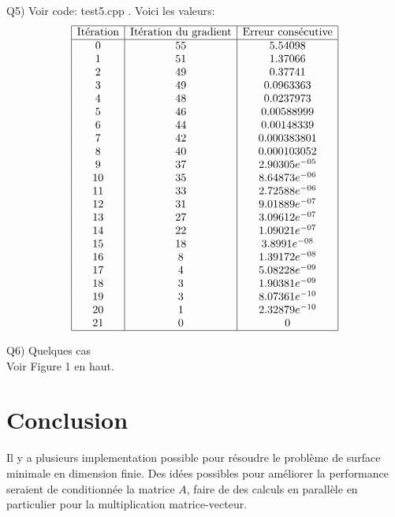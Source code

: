 \documentclass[a4paper, 11pt]{article}
\begin{document}
Q5) Voir code: test5.cpp . Voici les valeurs: \\
$$
\begin{array}{|c|c|c|}
\hline
\text{It\'eration} & \text{It\'eration du gradient} & \text{Erreur cons\'ecutive}
 \\
\hline
0 & 55 & 5.54098 \\
1 & 51 & 1.37066 \\
2 & 49 & 0.37741 \\
3 & 49 & 0.0963363 \\
4 & 48 & 0.0237973 \\
5 & 46 & 0.00588999 \\
6 & 44 & 0.00148339 \\
7 & 42 & 0.000383801 \\
8 & 40 & 0.000103052 \\
9 & 37 & 2.90305e^{-05} \\
10 & 35 & 8.64873e^{-06} \\
11 & 33 & 2.72588e^{-06} \\
12 & 31 & 9.01889e^{-07} \\
13 & 27 & 3.09612e^{-07} \\
14 & 22 & 1.09021e^{-07} \\
15 & 18 & 3.8991e^{-08} \\
16 & 8 & 1.39172e^{-08} \\
17 & 4 & 5.08228e^{-09} \\
18 & 3 & 1.90381e^{-09} \\
19 & 3 & 8.07361e^{-10} \\
20 & 1 & 2.32879e^{-10} \\
21 & 0 & 0 \\
\hline
\end{array}
$$


Q6) Quelques cas \\
Voir Figure 1 en haut.

\newpage

\section{Conclusion}
Il y a plusieurs implementation possible pour r\'esoudre le probl\`eme de
 surface minimale en dimension finie. Des id\'ees possibles pour am\'eliorer la
 performance seraient de conditionn\'ee la matrice $A$, faire de des calculs
 en parall\`ele en particulier pour la multiplication matrice-vecteur.
\end{document}
